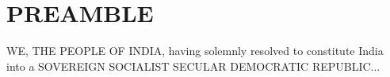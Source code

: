 \section*{PREAMBLE} 
 
\begin{center} 
\large 
WE, THE PEOPLE OF INDIA, having solemnly resolved to constitute 
India into a SOVEREIGN SOCIALIST SECULAR DEMOCRATIC REPUBLIC... 
\end{center} 
\newpage 
